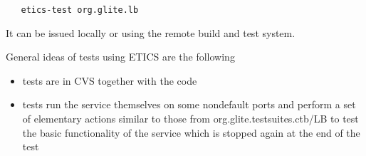 \begin{verbatim}
   etics-test org.glite.lb
\end{verbatim}

It can be issued locally or using the remote build and test system.

General ideas of \LB tests using ETICS are the following

\begin{itemize}
\item tests are in CVS together with the code

\item tests run the service themselves on some nondefault ports and perform a set of 
elementary actions similar to those from org.glite.testsuites.ctb/LB
to test the basic functionality of the service which is stopped again at the 
end of the test

\end{itemize} 
